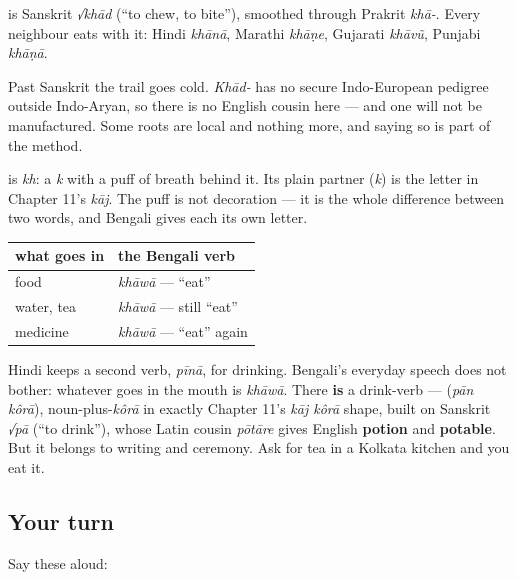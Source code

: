 \begin{cousinweb}
\textbf{} is Sanskrit \emph{√khād} (\textquotedblleft{}to chew, to bite\textquotedblright{}), smoothed through Prakrit \emph{khā-}. Every neighbour eats with it: Hindi \emph{khānā}, Marathi \emph{khāṇe}, Gujarati \emph{khāvũ}, Punjabi \emph{khāṇā}.

Past Sanskrit the trail goes cold. \emph{Khād-} has no secure Indo-European pedigree outside Indo-Aryan, so there is no English cousin here — and one will not be manufactured. Some roots are local and nothing more, and saying so is part of the method.
\end{cousinweb}

\begin{sounds}
\textbf{} is \emph{kh}: a \emph{k} with a puff of breath behind it. Its plain partner \textbf{} (\emph{k}) is the letter in Chapter 11's \emph{kāj}. The puff is not decoration — it is the whole difference between two words, and Bengali gives each its own letter.
\end{sounds}

\begin{grammarlens}[title={Grammar Lens: Bengali eats its drinks}]
\noindent
\begin{tabularx}{\linewidth}{@{}>{\raggedright\arraybackslash}X>{\raggedright\arraybackslash}X@{}}
\toprule
\textbf{what goes in} & \textbf{the Bengali verb} \\
\midrule
food & \emph{khāwā} — \textquotedblleft{}eat\textquotedblright{} \\
water, tea & \emph{khāwā} — still \textquotedblleft{}eat\textquotedblright{} \\
medicine & \emph{khāwā} — \textquotedblleft{}eat\textquotedblright{} again \\
\bottomrule
\end{tabularx}

Hindi keeps a second verb, \emph{pīnā}, for drinking. Bengali's everyday speech does not bother: whatever goes in the mouth is \emph{khāwā}. There \textbf{is} a drink-verb —   (\emph{pān kôrā}), noun-plus-\emph{kôrā} in exactly Chapter 11's \emph{kāj kôrā} shape, built on Sanskrit \emph{√pā} (\textquotedblleft{}to drink\textquotedblright{}), whose Latin cousin \emph{pōtāre} gives English \textbf{potion} and \textbf{potable}. But it belongs to writing and ceremony. Ask for tea in a Kolkata kitchen and you eat it.
\end{grammarlens}

\subsection*{Your turn}
Say these aloud:

